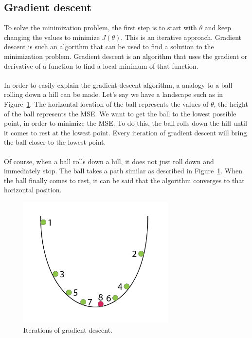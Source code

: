\subsection{Gradient descent}
To solve the minimization problem, the first step is to start with $\theta$ and keep changing the values to minimize $J(\theta)$. This is an iterative approach.  Gradient descent is such an algorithm that can be used to find a solution to the minimization problem. Gradient descent is an algorithm that uses the gradient or derivative of a function to find a local minimum of that function. \\\\
In order to easily explain the gradient descent algorithm, a analogy to a ball rolling down a hill can be made. \cite{rollingBall} Let's say we have a landscape such as in Figure~\ref{fig:gradient}. The horizontal location of the ball represents the values of $\theta$, the height of the ball represents the MSE. We want to get the ball to the lowest possible point, in order to minimize the MSE. To do this, the ball rolls down the hill until it comes to rest at the lowest point. Every iteration of gradient descent will bring the ball closer to the lowest point. \\\\
Of course, when a ball rolls down a hill, it does not just roll down and immediately stop. The ball takes a path similar as described in Figure~\ref{fig:gradient}. When the ball finally comes to rest, it can be said that the algorithm converges to that horizontal position.
 \begin{figure}[H]
\centering
\includegraphics[width=0.7\textwidth]{Figures/gradient}
\decoRule
\caption[Gradient descent]{Iterations of gradient descent. \cite{gradient-fig}}
\label{fig:gradient}
\end{figure}
